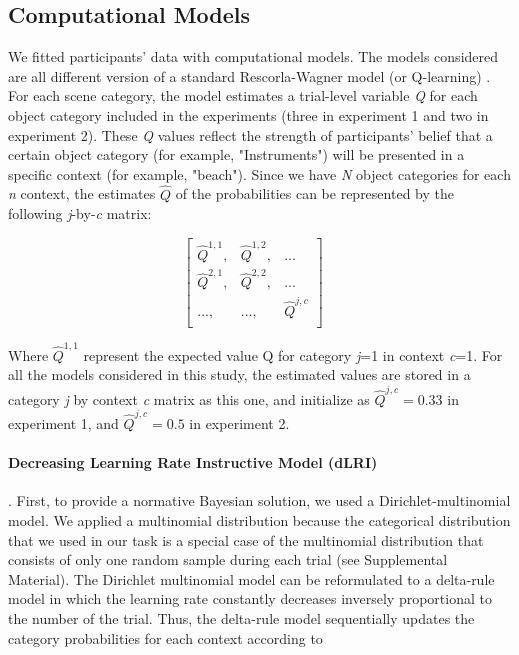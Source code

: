 \documentclass[a4paper,12pt]{article}
\begin{document}
\subsection{Computational Models}
We fitted participants' data with computational models. The models considered are all different version of a standard Rescorla-Wagner model (or Q-learning) \citep{Sutton1998, Daw2011}. For each scene category, the model estimates a trial-level variable \textit{Q} for each object category included in the experiments (three in experiment 1 and two in experiment 2). These \textit{Q} values reflect the strength of participants' belief that a certain object category (for example, "Instruments") will be presented in a specific context (for example, "beach"). 
\noindent
Since we have \textit{N} object categories for each \textit{n} context, the estimates $\hat{Q}$ of the probabilities can be represented by the following \textit{j}-by-\textit{c} matrix:

\begin{equation}
\begin{bmatrix} 
\hat{Q}^{1,1}, & \hat{Q}^{1,2}, & ... \\
\hat{Q}^{2,1}, & \hat{Q}^{2,2}, & ...\\
..., &..., & \hat{Q}^{j,c} \\
\end{bmatrix}
\quad
\label{matrix}
\end{equation}

\noindent
Where $\hat{Q}^{1,1}$ represent the expected value Q for category \textit{j}=1 in context \textit{c}=1. For all the models considered in this study, the estimated values are stored in a category \textit{j} by context \textit{c} matrix as this one, and initialize as  $\hat{Q}^{j,c} = 0.33$ in experiment 1, and $\hat{Q}^{j,c} = 0.5$ in experiment 2.

\paragraph{Decreasing Learning Rate Instructive Model (dLRI)}. First, to provide a normative Bayesian solution, we used a Dirichlet-multinomial model. We applied a multinomial distribution because the categorical distribution that we used in our task is a special case of the multinomial distribution that consists of only one random sample during each trial (see Supplemental Material). The Dirichlet multinomial model can be reformulated to a delta-rule model in which the learning rate constantly decreases inversely proportional to the number of the trial. 
Thus, the delta-rule model sequentially updates the category probabilities for each context according to
\end{document}
